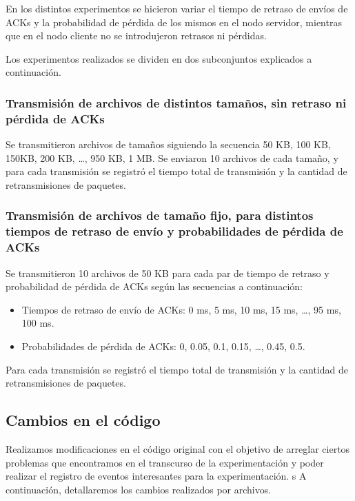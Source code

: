 \documentclass[a4paper, 10pt, twoside]{article}
\begin{document}
En los distintos experimentos se hicieron variar el tiempo de retraso de envíos de ACKs y la probabilidad de pérdida de los mismos en el nodo servidor, mientras que en el nodo cliente no se introdujeron retrasos ni pérdidas.

Los experimentos realizados se dividen en dos subconjuntos explicados a continuación.


\subsubsection{Transmisión de archivos de distintos tamaños, sin retraso ni pérdida de ACKs}

Se transmitieron archivos de tamaños siguiendo la secuencia 50 KB, 100 KB, 150KB, 200 KB, \ldots, 950 KB, 1 MB. Se enviaron 10 archivos de cada tamaño, y para cada transmisión se registró el tiempo total de transmisión y la cantidad de retransmisiones de paquetes.


\subsubsection{Transmisión de archivos de tamaño fijo, para distintos tiempos de retraso de envío y probabilidades de pérdida de ACKs}

Se transmitieron 10 archivos de 50 KB para cada par de tiempo de retraso y probabilidad de pérdida de ACKs según las secuencias a continuación:

\begin{itemize}
  \item Tiempos de retraso de envío de ACKs:  0 ms, 5 ms, 10 ms, 15 ms, \ldots, 95 ms, 100 ms.
  \item Probabilidades de pérdida de ACKs: 0, 0.05, 0.1, 0.15, \ldots, 0.45, 0.5.
\end{itemize}

Para cada transmisión se registró el tiempo total de transmisión y la cantidad de retransmisiones de paquetes.






\subsection{Cambios en el código}
Realizamos modificaciones en el código original con el objetivo de arreglar ciertos problemas que encontramos en el transcurso de la experimentación y poder realizar
el registro de eventos interesantes para la experimentación.
s
A continuación, detallaremos los cambios realizados por archivos.
\end{document}
